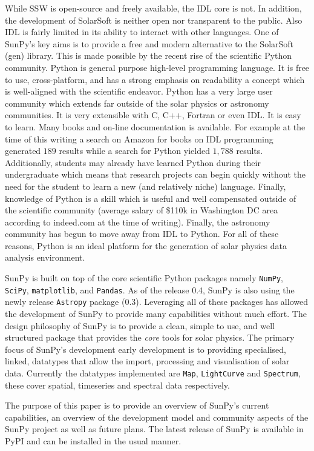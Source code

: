 While SSW is open-source and freely available, the IDL core is not. In 
addition, the development of SolarSoft is neither open nor transparent to the 
public. Also IDL is fairly limited in its ability to interact with other 
languages. One of SunPy's key aims is to provide a free and modern alternative 
to the SolarSoft (gen) library. This is made possible by the recent rise of the 
scientific Python community. Python is general purpose high-level programming 
language. It is free to use, cross-platform, and has a strong emphasis on 
readability a concept which is well-aligned with the scientific endeavor.
Python has a very large user community which extends far outside of the solar 
physics or astronomy communities. It is very extensible with C, C++, Fortran or 
even IDL. It is easy to learn. Many books and on-line documentation is 
available. For example at the time of this writing a search on Amazon for books 
on IDL programming generated $189$ results while a search for Python yielded 
$1,788$ results. Additionally, students may already have learned Python during 
their  undergraduate which means that research projects can begin quickly 
without the need for the student to learn a new (and relatively niche) 
language. Finally, knowledge of Python is a skill which is useful and well 
compensated outside of the scientific community (average salary of \$110k in 
Washington DC area according to indeed.com at the time of writing). Finally, 
the astronomy community has begun to move away from IDL to Python. For all of 
these reasons, Python is an ideal platform for the generation of solar physics 
data analysis environment.

SunPy is built on top of the core scientific Python packages namely 
\texttt{NumPy}, \texttt{SciPy}, \texttt{matplotlib}, and \texttt{Pandas}. As of 
the release 0.4, SunPy is also using the newly release \texttt{Astropy} package 
(0.3). Leveraging all of these packages has allowed the development of SunPy to 
provide many capabilities without much effort. The design philosophy of SunPy 
is to provide a clean, simple to use, and well structured package that provides 
the \textit{core} tools for solar physics. The primary focus of SunPy's 
development early development is to providing specialised,  linked, datatypes 
that allow the import, processing and visualisation of solar  data. Currently 
the datatypes implemented are \texttt{Map}, \texttt{LightCurve} and 
\texttt{Spectrum}, these cover spatial, timeseries and spectral data  
respectively.

The purpose of this paper is to provide an overview of SunPy's current 
capabilities, an overview of the development model and community aspects of the 
SunPy project as well as future plans. The latest release of SunPy is available 
in PyPI and can be installed in the usual manner.
